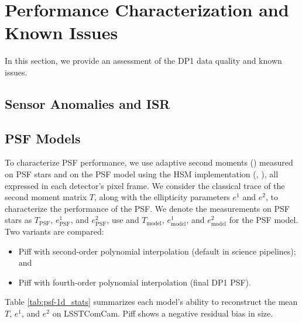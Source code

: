 \section{Performance Characterization and Known Issues
\label{sec:performance}}
%
In this section, we provide an assessment of the \gls{DP1} data quality and known issues.
%

\subsection{Sensor Anomalies and ISR}
\label{ssec:sensor_anomalies}

 

\subsection{PSF Models
\label{ssec:psf_models}}

To characterize \gls{PSF} performance, we use adaptive second moments (\citealt{2002AJ....123..583B})
measured on \gls{PSF} stars and on the PSF model using the \gls{HSM} 
implementation (\citealt{2003MNRAS.343..459H}, \citealt{2005MNRAS.361.1287M}), 
all expressed in each detector's pixel frame.
We consider the classical trace of the second moment matrix $T$, along with the ellipticity parameters $e^1$ and $e^2$, to characterize the performance of the PSF.
We denote the measurements on \gls{PSF} stars as $T_{\text{PSF}}$, $e^1_{\text{PSF}}$, and $e^2_{\text{PSF}}$, use and $T_{\text{model}}$, $e^1_{\text{model}}$, and $e^2_{\text{model}}$ for the \gls{PSF} model. Two variants are compared:
\begin{itemize}
\item Piff with second-order polynomial interpolation (default in science pipelines); and
\item Piff with fourth-order polynomial interpolation (final \gls{DP1} \gls{PSF}).
\end{itemize}

Table \ref{tab:psf-1d_stats} summarizes each model’s ability to reconstruct
the mean $T$, $e^1$, and $e^2$ on  \gls{LSSTComCam}. Piff shows a negative
residual bias in size. 


